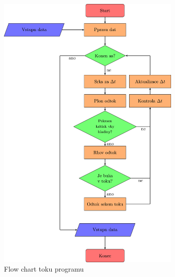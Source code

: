 \begin{figure}[t!]
  \includegraphics[width=0.8\textwidth]{./img/CZflowch.png}
  \caption{Flow chart toku programu}
  \label{fig:flowchart}
\end{figure}